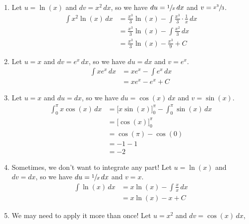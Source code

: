 \begin{Example}{}{}
    \begin{enumerate}[label=(\roman*)]
        \item Let $ u=\ln(x) $ and $ dv=x^2\,dx $, so we have
              $ du=\sfrac{1}{x} \,dx $ and $ v=\sfrac{x^3}{3} $.
              \begin{align*}
                  \int x^2\ln(x)\, d{x}
                   & =\frac{x^3}{3} \ln(x)-\int \frac{x^3}{3} \cdot \frac{1}{x} \, d{x} \\
                   & =\frac{x^3}{3} \ln(x)-\int \frac{x^2}{3}\, d{x}                    \\
                   & =\frac{x^3}{3} \ln(x)-\frac{x^3}{9} +C
              \end{align*}
        \item Let $ u=x $ and $ dv=e^x\,dx $, so we have $ du=dx $ and $ v=e^x $.
              \begin{align*}
                  \int x e^x\, d{x}
                   & =x e^x-\int e^x\, d{x} \\
                   & =x e^x-e^x+C
              \end{align*}
        \item Let $ u=x $ and $ du=dx $, so we have $ du=\cos(x)\,dx $ and $ v=\sin(x) $.
              \begin{align*}
                  \int_{0}^{\pi} x\cos(x)\, d{x}
                   & =\bigl[x\sin(x)\bigr]^{\pi}_{0}-\int_{0}^{\pi} \sin(x)\, d{x} \\
                   & =\bigl[\cos(x)\bigr]^{\pi}_{0}                                \\
                   & =\cos(\pi)-\cos(0)                                            \\
                   & =-1-1                                                         \\
                   & =-2
              \end{align*}
        \item Sometimes, we don't want to integrate any part! Let $ u=\ln(x) $
              and $ dv=dx $, so we have $ du=\sfrac{1}{x}\,dx $ and $ v=x $.
              \begin{align*}
                  \int \ln(x)\, d{x}
                   & =x\ln(x)-\int \frac{x}{x} \, d{x} \\
                   & =x\ln(x)-x+C
              \end{align*}
        \item We may need to apply it more than once! Let $ u=x^2 $ and $ dv=\cos(x)\,dx $,

\end{enumerate}
\end{Example}

